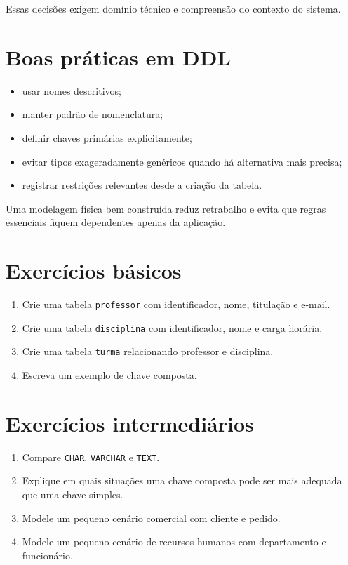 Essas decisões exigem domínio técnico e compreensão do contexto do sistema.

\section{Boas práticas em DDL}

\begin{itemize}
    \item usar nomes descritivos;
    \item manter padrão de nomenclatura;
    \item definir chaves primárias explicitamente;
    \item evitar tipos exageradamente genéricos quando há alternativa mais precisa;
    \item registrar restrições relevantes desde a criação da tabela.
\end{itemize}

\begin{quadro_dica}
Uma modelagem física bem construída reduz retrabalho e evita que regras essenciais fiquem dependentes apenas da aplicação.
\end{quadro_dica}

\section{Exercícios básicos}

\begin{enumerate}
    \item Crie uma tabela \texttt{professor} com identificador, nome, titulação e e-mail.
    \item Crie uma tabela \texttt{disciplina} com identificador, nome e carga horária.
    \item Crie uma tabela \texttt{turma} relacionando professor e disciplina.
    \item Escreva um exemplo de chave composta.
\end{enumerate}

\section{Exercícios intermediários}

\begin{enumerate}
    \item Compare \texttt{CHAR}, \texttt{VARCHAR} e \texttt{TEXT}.
    \item Explique em quais situações uma chave composta pode ser mais adequada que uma chave simples.
    \item Modele um pequeno cenário comercial com cliente e pedido.
    \item Modele um pequeno cenário de recursos humanos com departamento e funcionário.
\end{enumerate}

